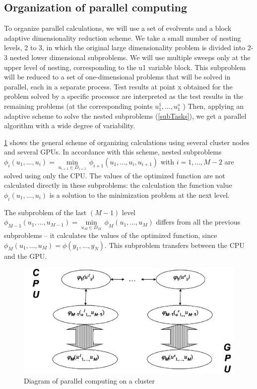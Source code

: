 \documentclass{svproc}
\begin{document}
\subsection{Organization of parallel computing}

To organize parallel calculations, we will use a set of evolvents and a block adaptive dimensionality reduction scheme. We take a small number of nesting levels, 2 to 3, in which the original large dimensionality problem is divided into 2-3 nested lower dimensional subproblems. We will use multiple sweeps only at the upper level of nesting, corresponding to the u1 variable block. This subproblem will be reduced to a set of one-dimensional problems that will be solved in parallel, each in a separate process. Test results at point x obtained for the problem solved by a specific processor are interpreted as the test results in the remaining problems (at the corresponding points \(u^1_1,… , u^s_1\) )
Then, applying an adaptive scheme to solve the nested subproblems (\ref{subTasks}), we get a parallel algorithm with a wide degree of variability.

\ref{fig:Parallel_Computing} shows the general scheme of organizing calculations using several cluster nodes and several GPUs. In accordance with this scheme, nested subproblems  ${{\phi }_{i}}({{u}_{1}},...,{{u}_{i}})=\underset{{{u}_{i+1}}\in {{D}_{i+1}}}{\mathop{\min }}\,{{\phi }_{i+1}}({{u}_{1}},...,{{u}_{i}},{{u}_{i+1}})$  with \(i=1,\ldots ,M-2\) are solved using only the CPU. The values of the optimized function are not calculated directly in these subproblems: the calculation the function value  ${{\phi }_{i}}({{u}_{1}},...,{{u}_{i}})$ is a solution to the minimization problem at the next level.

The subproblem of the last \((M - 1)\) level \({{\phi }_{M-1}}({{u}_{1}},...,{{u}_{M-1}})=\underset{{{u}_{M}}\in {{D}_{M}}}{\mathop{\min }}\,{{\phi }_{M}}({{u}_{1}},...,{{u}_{M}})\) differs from all the previous subproblems – it calculates the values of the optimized function, since ${{\phi }_{M}}({{u}_{1}},...,{{u}_{M}})=\phi ({{y}_{1}},...,{{y}_{N}})$. This subproblem transfers between the CPU and the GPU.

   \begin{figure}[h!]
    \centering
		\includegraphics[width=1.0\textwidth]{Parallel_Computing.eps}
		\caption{Diagram of parallel computing on a cluster}\label{fig:Parallel_Computing}
\end{figure}
\end{document}
